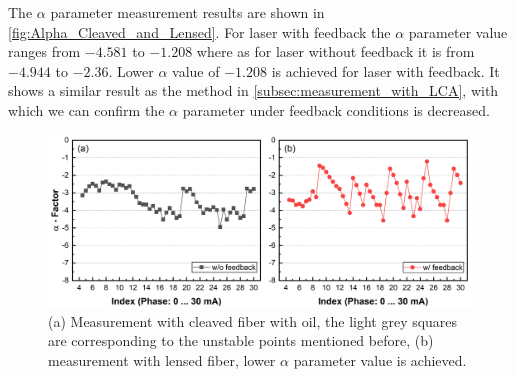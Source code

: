 The $\alpha$ parameter measurement results are shown in \autoref{fig:Alpha_Cleaved_and_Lensed}. For laser with feedback the $\alpha$ parameter value ranges from $-4.581$ to $-1.208$ where as for laser without feedback it is from $-4.944$ to $-2.36$. Lower $\alpha$ value of $-1.208$ is achieved for laser with feedback. It shows a similar result as the method in \autoref{subsec:measurement_with_LCA}, with which we can confirm the $\alpha$ parameter under feedback conditions is decreased.
\begin{figure}[ht]
    \centering
    \includegraphics[width=\linewidth]{figures/Alpha_Cleaved_and_Lensed.png}
    \caption{(a) Measurement with cleaved fiber with oil, the light grey squares are corresponding to the unstable points mentioned before, (b) measurement with lensed fiber, lower $\alpha$ parameter value is achieved.}
    \label{fig:Alpha_Cleaved_and_Lensed}
\end{figure}


